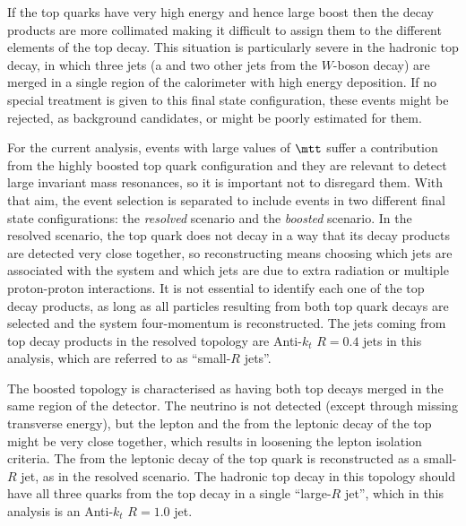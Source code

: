 If the top quarks have very high energy and hence large boost then the
decay products are more collimated making it difficult to assign them 
to the different elements of the top decay.
This situation is particularly severe in the hadronic top decay, in which three jets (a \bjet and two
other jets from the $W$-boson decay) are merged in a single region of the calorimeter with high energy deposition. If no special treatment is given to this
final state configuration, these events might be rejected, as background candidates, or \mtt might be poorly estimated for them.

For the current analysis,
events with large values of $\mtt$ suffer a contribution from the highly boosted top quark configuration and
they are relevant to detect large invariant mass resonances, so it is important not to disregard them.
With that aim, the event selection is separated to include events in two different final state configurations: the \emph{resolved} scenario and the \emph{boosted} scenario.
In the resolved scenario, the top quark does not decay in a way that its decay products are detected very close together, so reconstructing \mtt
means choosing which jets are associated with the \ttbar system and which jets are due to extra radiation or multiple proton-proton interactions.
It is
not essential to identify each one of the top decay products, as long as all particles resulting from both top quark decays are selected and the \ttbar system four-momentum
is reconstructed. The jets coming from top decay products in the resolved topology are Anti-$k_t$ $R=0.4$ jets in this analysis, which are referred to as
``small-$R$ jets''.

The boosted topology is characterised as having both top decays merged in the same region of the detector. The neutrino is
not detected (except through missing transverse energy), but the lepton and the \bjet from the leptonic decay of the top might be very close together, which results in loosening the lepton isolation criteria.
The \bjet from the leptonic decay of the top quark is reconstructed as a small-$R$ jet, as in the resolved scenario.
The hadronic top decay in this topology should have all three quarks from the top decay in a single ``large-$R$ jet'', which in this analysis is an Anti-$k_t$ $R=1.0$ jet.

